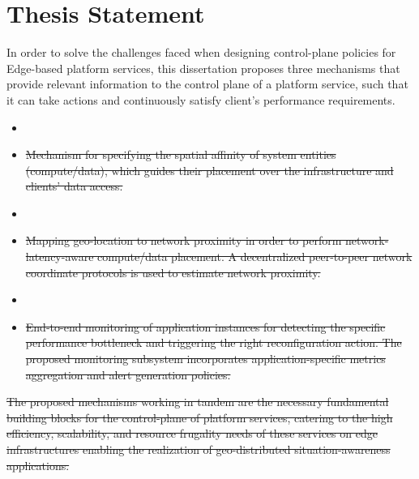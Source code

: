 \section{Thesis Statement}
In order to solve the challenges faced when designing control-plane policies for Edge-based platform services, this dissertation proposes three mechanisms that provide relevant information to the control plane of a platform service, such that it can take actions and continuously satisfy client's performance requirements.
\begin{itemize}
\item {}
\item \sout{Mechanism for specifying the spatial affinity of system entities (compute/data), which guides their placement over the infrastructure and clients' data access. }
\item {}
\item \sout{Mapping geo-location to network proximity in order to perform network-latency-aware compute/data placement. A decentralized peer-to-peer network coordinate protocols is used to estimate network proximity.}
\item {}
\item \sout{End-to-end monitoring of application instances for detecting the specific performance bottleneck and triggering the right reconfiguration action. The proposed monitoring subsystem incorporates application-specific metrics aggregation and alert generation policies.}
\end{itemize}

\sout{The proposed mechanisms working in tandem are the necessary fundamental building blocks for the control-plane of platform services, catering to the high efficiency, scalability, and resource frugality needs of these services on edge infrastructures enabling the realization of geo-distributed situation-awareness applications.}

